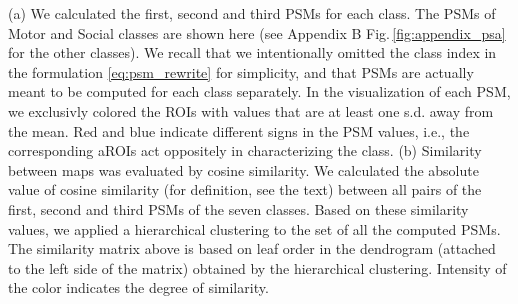 \label{fig:PSA}
(a)
We calculated the first, second and third PSMs for each class. The PSMs of Motor and Social classes are shown here (see Appendix B Fig.\,\ref{fig:appendix_psa} for the other classes).
%
We recall that we intentionally omitted the class index in the formulation \eqref{eq:psm_rewrite} for simplicity, 
and that PSMs are actually meant to be computed for each class separately. 
% 
In the visualization of each PSM, we exclusivly colored the ROIs with values that are at least one s.d. away from the mean. 
%
Red and blue indicate different signs in the PSM values, i.e., the corresponding aROIs act oppositely in characterizing the class.
(b)
Similarity between maps was evaluated by cosine similarity.
We calculated the absolute value of cosine similarity (for definition, see the text) between all pairs of the first, second and third PSMs of the seven classes. Based on these similarity values, we applied a hierarchical clustering to the set of all the computed PSMs. 
The similarity matrix above is based on leaf order in the dendrogram (attached to the left side of the matrix) obtained by the hierarchical clustering. Intensity of the color indicates the degree of similarity.
